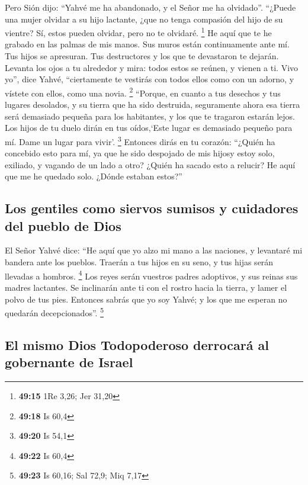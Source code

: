 \begin{paracol}{2}
 Pero Sión dijo: ``Yahvé me ha abandonado, y el Señor me
ha olvidado''.  ``¿Puede una mujer olvidar a su hijo
lactante, ¿que no tenga compasión del hijo de su vientre? Sí, estos
pueden olvidar, pero no te olvidaré. \footnote{\textbf{49:15} 1Re 3,26;
  Jer 31,20}  He aquí que te he grabado en las palmas de
mis manos. Sus muros están continuamente ante mí.  Tus
hijos se apresuran. Tus destructores y los que te devastaron te dejarán.
 Levanta los ojos a tu alrededor y mira: todos estos se
reúnen, y vienen a ti. Vivo yo'', dice Yahvé, ``ciertamente te vestirás
con todos ellos como con un adorno, y vístete con ellos, como una novia.
\footnote{\textbf{49:18} Is 60,4}  ``Porque, en cuanto a
tus desechos y tus lugares desolados, y su tierra que ha sido destruida,
seguramente ahora esa tierra será demasiado pequeña para los habitantes,
y los que te tragaron estarán lejos.  Los hijos de tu
duelo dirán en tus oídos,`Este lugar es demasiado pequeño para mí. Dame
un lugar para vivir'. \footnote{\textbf{49:20} Is 54,1} 
Entonces dirás en tu corazón: ``¿Quién ha concebido esto para mí, ya que
he sido despojado de mis hijosy estoy solo, exiliado, y vagando de un
lado a otro? ¿Quién ha sacado esto a relucir? He aquí que me he quedado
solo. ¿Dónde estaban estos?''

\hypertarget{los-gentiles-como-siervos-sumisos-y-cuidadores-del-pueblo-de-dios}{%
\subsection{Los gentiles como siervos sumisos y cuidadores del pueblo de
Dios}\label{los-gentiles-como-siervos-sumisos-y-cuidadores-del-pueblo-de-dios}}

 El Señor Yahvé dice: ``He aquí que yo alzo mi mano a las
naciones, y levantaré mi bandera ante los pueblos. Traerán a tus hijos
en su seno, y tus hijas serán llevadas a hombros. \footnote{\textbf{49:22}
  Is 60,4}  Los reyes serán vuestros padres adoptivos, y
sus reinas sus madres lactantes. Se inclinarán ante ti con el rostro
hacia la tierra, y lamer el polvo de tus pies. Entonces sabrás que yo
soy Yahvé; y los que me esperan no quedarán decepcionados''. \footnote{\textbf{49:23}
  Is 60,16; Sal 72,9; Miq 7,17}

\hypertarget{el-mismo-dios-todopoderoso-derrocaruxe1-al-gobernante-de-israel}{%
\subsection{El mismo Dios Todopoderoso derrocará al gobernante de
Israel}\label{el-mismo-dios-todopoderoso-derrocaruxe1-al-gobernante-de-israel}}


\end{paracol}
